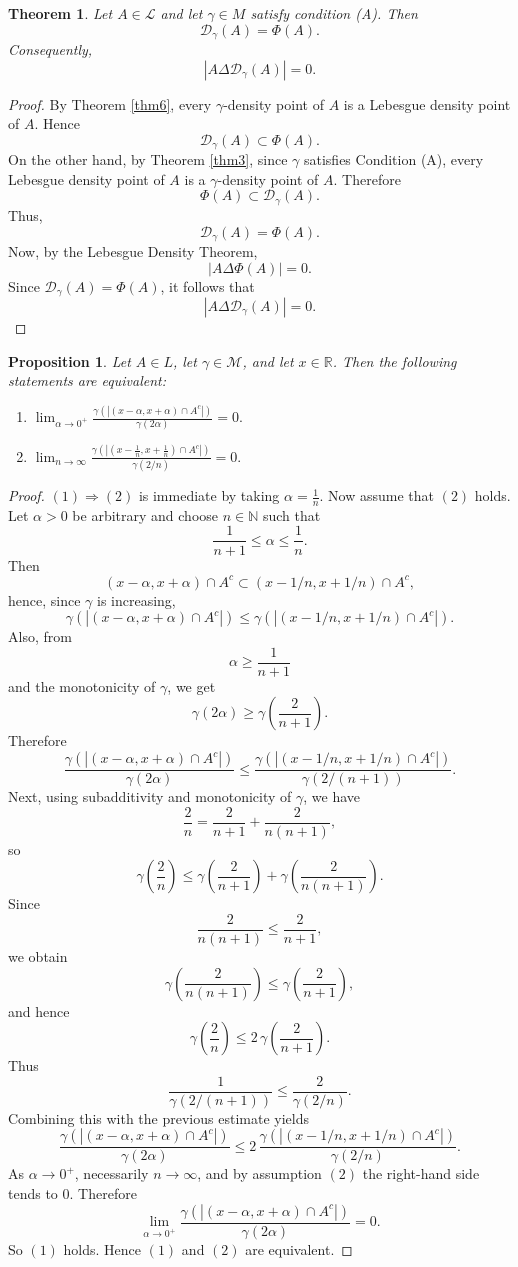 \documentclass{amsart}
\newtheorem{theorem}{Theorem}
\theoremstyle{plain}
\newtheorem{proposition}{Proposition}
\numberwithin{equation}{section}
\begin{document}
\begin{theorem}\label{m3}
Let $A\in\mathcal L$ and let $\gamma\in M$ satisfy condition (A). Then
$$\mathcal{D}_\gamma(A)=\Phi(A).$$
Consequently,
$$|A\Delta \mathcal{D}_\gamma(A)|=0.$$
\end{theorem} 
 \begin{proof}   
By Theorem \ref{thm6}, every $\gamma$-density point of $A$ is a Lebesgue density point of $A$. Hence
$$\mathcal{D}_\gamma(A)\subset \Phi(A).$$
On the other hand, by Theorem \ref{thm3}, since $\gamma$ satisfies Condition (A), every Lebesgue density point of $A$ is a $\gamma$-density point of $A$. Therefore
$$\Phi(A)\subset \mathcal{D}_\gamma(A).$$
Thus,
$$\mathcal{D}_\gamma(A)=\Phi(A).$$
Now, by the Lebesgue Density Theorem,
$$|A\Delta \Phi(A)|=0.$$
Since $\mathcal{D}_\gamma(A)=\Phi(A)$, it follows that
$$|A\Delta \mathcal{D}_\gamma(A)|=0.$$

\end{proof}
\begin{proposition}\label{pn1.11}
Let $A \in L$, let $\gamma \in \mathcal{M}$, and let $x \in \mathbb{R}$. Then the following statements are equivalent:
\begin{enumerate}
\item $
\lim_{\alpha \to 0^+}
\frac{\gamma(|(x-\alpha,x+\alpha)\cap A^c|)}{\gamma(2\alpha)}=0.$
\item
$\lim_{n \to \infty}
\frac{\gamma(|(x-\frac1n,x+\frac1n)\cap A^c|)}{\gamma(2/n)}=0.$
\end{enumerate}
\end{proposition}
\begin{proof}
$(1)\Rightarrow(2)$ is immediate by taking $\alpha=\frac1n$.
Now assume that $(2)$ holds. Let $\alpha>0$ be arbitrary and choose $n\in\mathbb{N}$ such that
$$\frac{1}{n+1}\le \alpha \le \frac{1}{n}.$$
Then$$(x-\alpha,x+\alpha)\cap A^c \subset (x-1/n,x+1/n)\cap A^c,$$
hence, since $\gamma$ is increasing,
$$\gamma(|(x-\alpha,x+\alpha)\cap A^c|)\le \gamma(|(x-1/n,x+1/n)\cap A^c|).$$
Also, from $$\alpha \ge \frac{1}{n+1}$$
and the monotonicity of $\gamma$, we get
$$\gamma(2\alpha)\ge \gamma\!\left(\frac{2}{n+1}\right).$$
Therefore
$$\frac{\gamma(|(x-\alpha,x+\alpha)\cap A^c|)}{\gamma(2\alpha)}
\le \frac{\gamma(|(x-1/n,x+1/n)\cap A^c|)}{\gamma(2/(n+1))}.$$
Next, using subadditivity and monotonicity of $\gamma$, we have
$$\frac{2}{n} = \frac{2}{n+1}+\frac{2}{n(n+1)}, $$
so
$$ \gamma\!\left(\frac{2}{n}\right) \le \gamma\!\left(\frac{2}{n+1}\right) + \gamma\!\left(\frac{2}{n(n+1)}\right).$$
Since $$\frac{2}{n(n+1)} \le \frac{2}{n+1}, $$
we obtain
$$\gamma\!\left(\frac{2}{n(n+1)}\right)\le \gamma\!\left(\frac{2}{n+1}\right), $$
and hence $$ \gamma\!\left(\frac{2}{n}\right)\le 2\,\gamma\!\left(\frac{2}{n+1}\right). $$
Thus
$$\frac{1}{\gamma(2/(n+1))}\le \frac{2}{\gamma(2/n)}. $$
Combining this with the previous estimate yields
$$ \frac{\gamma(|(x-\alpha,x+\alpha)\cap A^c|)}{\gamma(2\alpha)}
\le 2\,\frac{\gamma(|(x-1/n,x+1/n)\cap A^c|)}{\gamma(2/n)}. $$
As $\alpha\to0^+$, necessarily $n\to\infty$, and by assumption $(2)$ the right-hand side tends to $0$. Therefore
$$\lim_{\alpha\to0^+}
\frac{\gamma(|(x-\alpha,x+\alpha)\cap A^c|)}{\gamma(2\alpha)}=0. $$
So $(1)$ holds.
Hence $(1)$ and $(2)$ are equivalent.
\end{proof}
\end{document}
